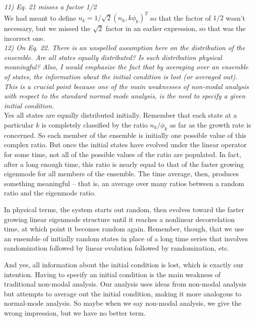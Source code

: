 \documentclass[12pt]{article}
\begin{document}
\emph{11) Eq. 21 misses a factor 1/2 }\\

We had meant to define $u_k = 1/ \sqrt{2} (n_k, k \phi_k)^T$ so that the factor of $1/2$ wasn't necessary, but we missed the $\sqrt{2}$ factor in an earlier expression, so that was the incorrect one.\\

\emph{12) On Eq. 22. There is an unspelled assumption here on the distribution of the ensemble. Are all states equally distributed? Is such distribution physical meaningful? Also, I would emphasize the fact that by averaging over an ensemble of states, the information about the initial condition is lost (or averaged out). This is a crucial point because one of the main weaknesses of non-modal analysis with respect to the standard normal mode analysis, is the need to specify a given initial condition. }\\

Yes all states are equally distributed initially. Remember that each state at a particular $k$ is completely classified by the ratio $n_k/\phi_k$ as far as the growth rate is concerned.
So each member of the ensemble is initially one possible value of this complex ratio. But once the initial states have evolved under the linear operator for some time, not all of
the possible values of the ratio are populated. In fact, after a long enough time, this ratio is nearly equal to that of the faster growing eigenmode for all members of the ensemble.
The time average, then, produces something meaningful -- that is, an average over many ratios between a random ratio and the eigenmode ratio. 

In physical terms, the system starts out random, then evolves toward the faster growing linear eigenmode structure until it reaches a nonlinear decorrelation time, at which point it becomes
random again. Remember, though, that we use an ensemble of initially random states in place of a long time series that involves randomization followed by linear evolution followed by
randomization, etc.

And yes, all information about the initial condition is lost, which is exactly our intention. Having to specify an initial condition is the main weakness of traditional non-modal analysis.
Our analysis uses ideas from non-modal analysis but attempts to average out the initial condition, making it more analogous to normal-mode analysis. So maybe when we say non-modal analysis,
we give the wrong impression, but we have no better term.\\
\end{document}

